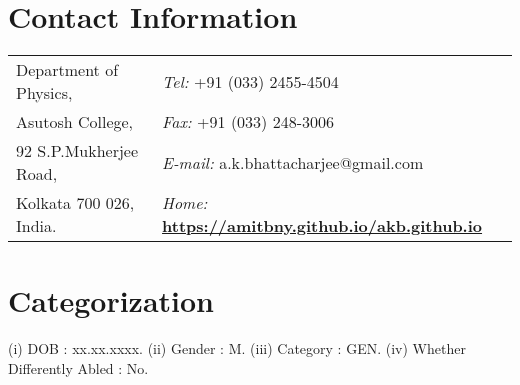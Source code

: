 \documentclass[margin,line]{res}
\begin{document}
\begin{resume}



\section{\sc Contact Information}
\vspace{.05in}
\begin{tabular}{@{}p{2.5in}p{4in}}
Department of Physics,                    & {\it Tel:}  +91 (033) 2455-4504 \\            
Asutosh College,                          & {\it Fax:}  +91 (033) 248-3006 \\         
92 S.P.Mukherjee Road,                    & {\it E-mail:} a.k.bhattacharjee@gmail.com\\       
Kolkata 700 026, India.                   & {\it Home:} \href{https://amitbny.github.io/akb.github.io}{\textbf{https://amitbny.github.io/akb.github.io}}
\end{tabular}

\section{\sc Categorization}
(i) DOB : xx.xx.xxxx. (ii) Gender : M. (iii) Category : GEN. (iv) Whether Differently Abled : No.	 
\vspace{1mm}


\end{resume}
\end{document}
